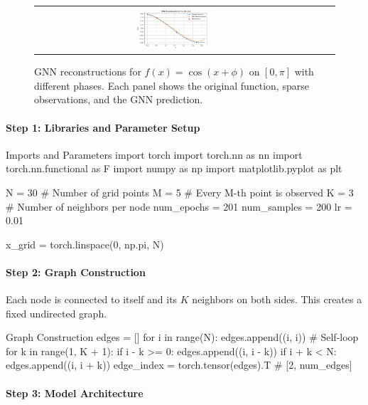 \begin{figure}[ht]
\begin{tabular}{ccc}
    \includegraphics[width=0.3\textwidth]{images/gnn_obs_naive_j1_jj1_8.png} \\
  \end{tabular}
  \caption{GNN reconstructions for $f(x) = \cos(x + \phi)$ on $[0, \pi]$ with different phases. Each panel shows the original function, sparse observations, and the GNN prediction.}
  \label{fig:gnn_j1_jj1}
\end{figure}


\paragraph{Step 1: Libraries and Parameter Setup}

\begin{codeonly}{Imports and Parameters}
import torch
import torch.nn as nn
import torch.nn.functional as F
import numpy as np
import matplotlib.pyplot as plt

N = 30           # Number of grid points
M = 5            # Every M-th point is observed
K = 3            # Number of neighbors per node
num_epochs = 201
num_samples = 200
lr = 0.01

x_grid = torch.linspace(0, np.pi, N)
\end{codeonly}

\paragraph{Step 2: Graph Construction}

Each node is connected to itself and its $K$ neighbors on both sides. This creates a fixed undirected graph.

\begin{codeonly}{Graph Construction}
edges = []
for i in range(N):
    edges.append((i, i))  # Self-loop
    for k in range(1, K + 1):
        if i - k >= 0:
            edges.append((i, i - k))
        if i + k < N:
            edges.append((i, i + k))
edge_index = torch.tensor(edges).T  # [2, num_edges]
\end{codeonly}

\paragraph{Step 3: Model Architecture}


